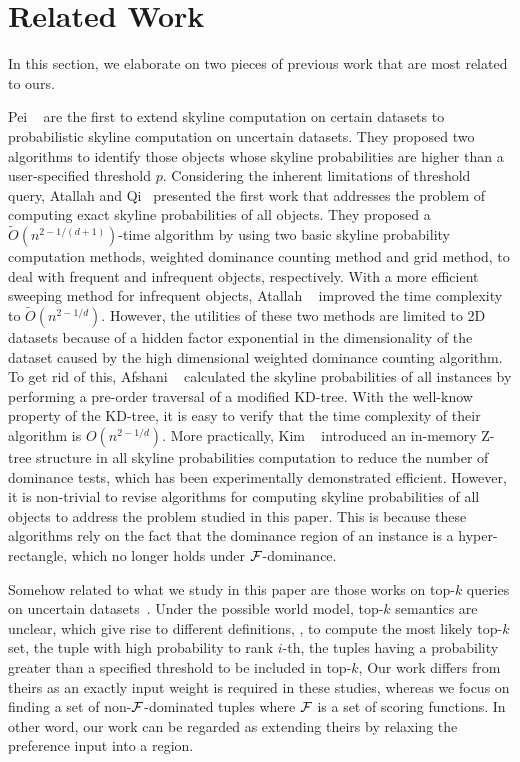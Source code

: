 \section{Related Work}\label{sec:relatedwork}

In this section, we elaborate on two pieces of previous work that are most related to ours.

Pei \etal~\cite{DBLP:conf/vldb/PeiJLY07} are the first to extend skyline computation on certain datasets to probabilistic skyline computation on uncertain datasets.
They proposed two algorithms to identify those objects whose skyline probabilities are higher than a user-specified threshold $p$.
Considering the inherent limitations of threshold query, Atallah and Qi~\cite{DBLP:conf/pods/AtallahQ09} presented the first work that addresses the problem of computing exact skyline probabilities of all objects.
They proposed a $\tilde{O}(n^{2-1/(d+1)})$-time algorithm by using two basic skyline probability computation methods, weighted dominance counting method and grid method, to deal with frequent and infrequent objects, respectively. 
With a more efficient sweeping method for infrequent objects, Atallah \etal~\cite{DBLP:journals/tods/AtallahQY11} improved the time complexity to $\tilde{O}(n^{2-1/d})$.
However, the utilities of these two methods are limited to 2D datasets because of a hidden factor exponential in the dimensionality of the dataset caused by the high dimensional weighted dominance counting algorithm.
To get rid of this, Afshani \etal~\cite{DBLP:journals/mst/AfshaniAALP13} calculated the skyline probabilities of all instances by performing a pre-order traversal of a modified KD-tree.
With the well-know property of the KD-tree, it is easy to verify that the time complexity of their algorithm is $O(n^{2-1/d})$.
More practically, Kim \etal~\cite{DBLP:journals/tkde/KimIP12} introduced an in-memory Z-tree structure in all skyline probabilities computation to reduce the number of dominance tests, which has been experimentally demonstrated efficient.
However, it is non-trivial to revise algorithms for computing skyline probabilities of all objects to address the problem studied in this paper.
This is because these algorithms rely on the fact that the dominance region of an instance is a hyper-rectangle, which no longer holds under $\mathcal{F}$-dominance.

Somehow related to what we study in this paper are those works on top-$k$ queries on uncertain datasets~\cite{DBLP:conf/icde/SolimanIC07, DBLP:journals/dpd/WangSY16, DBLP:conf/icde/HuaPZL08, DBLP:conf/icde/YiLKS08, DBLP:conf/sigmod/GeZM09}.
Under the possible world model, top-$k$ semantics are unclear, which give rise to different definitions, \eg, to compute the most likely top-$k$ set, the tuple with high probability to rank $i$-th, the tuples having a probability greater than a specified threshold to be included in top-$k$, \etc
Our work differs from theirs as an exactly input weight is required in these studies, whereas we focus on finding a set of non-$\mathcal{F}$-dominated tuples where $\mathcal{F}$ is a set of scoring functions.
In other word, our work can be regarded as extending theirs by relaxing the preference input into a region.


